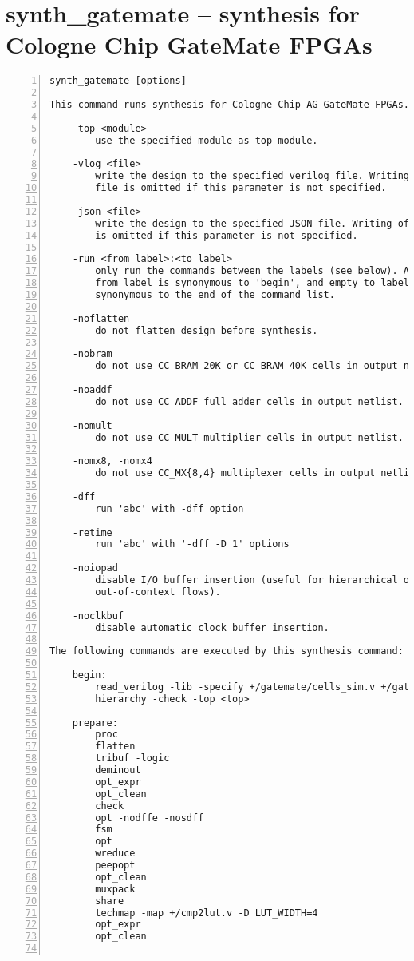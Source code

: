 \section{synth\_gatemate -- synthesis for Cologne Chip GateMate FPGAs}
\label{cmd:synth_gatemate}
\begin{lstlisting}[numbers=left,frame=single]
    synth_gatemate [options]

This command runs synthesis for Cologne Chip AG GateMate FPGAs.

    -top <module>
        use the specified module as top module.

    -vlog <file>
        write the design to the specified verilog file. Writing of an output
        file is omitted if this parameter is not specified.

    -json <file>
        write the design to the specified JSON file. Writing of an output file
        is omitted if this parameter is not specified.

    -run <from_label>:<to_label>
        only run the commands between the labels (see below). An empty
        from label is synonymous to 'begin', and empty to label is
        synonymous to the end of the command list.

    -noflatten
        do not flatten design before synthesis.

    -nobram
        do not use CC_BRAM_20K or CC_BRAM_40K cells in output netlist.

    -noaddf
        do not use CC_ADDF full adder cells in output netlist.

    -nomult
        do not use CC_MULT multiplier cells in output netlist.

    -nomx8, -nomx4
        do not use CC_MX{8,4} multiplexer cells in output netlist.

    -dff
        run 'abc' with -dff option

    -retime
        run 'abc' with '-dff -D 1' options

    -noiopad
        disable I/O buffer insertion (useful for hierarchical or 
        out-of-context flows).

    -noclkbuf
        disable automatic clock buffer insertion.

The following commands are executed by this synthesis command:

    begin:
        read_verilog -lib -specify +/gatemate/cells_sim.v +/gatemate/cells_bb.v
        hierarchy -check -top <top>

    prepare:
        proc
        flatten
        tribuf -logic
        deminout
        opt_expr
        opt_clean
        check
        opt -nodffe -nosdff
        fsm
        opt
        wreduce
        peepopt
        opt_clean
        muxpack
        share
        techmap -map +/cmp2lut.v -D LUT_WIDTH=4
        opt_expr
        opt_clean


\end{lstlisting}

